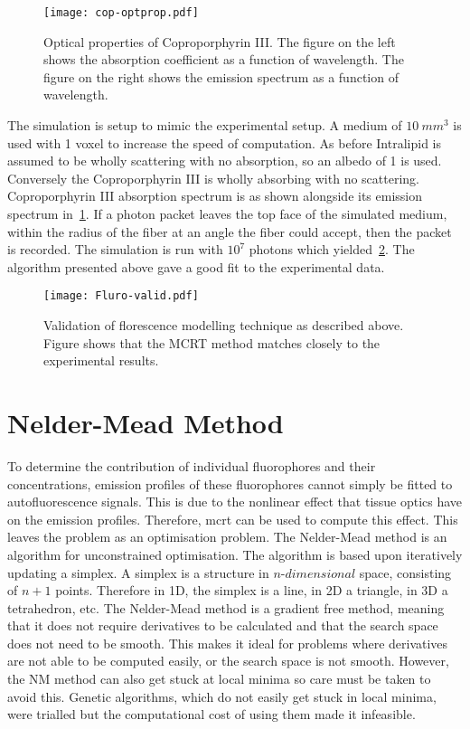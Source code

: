 \begin{figure}[!htpb]
	\centering
	\texttt{[image: cop-optprop.pdf]}
	\caption{Optical properties of Coproporphyrin III. The figure on the left shows the absorption coefficient as a function of wavelength. The figure on the right shows the emission spectrum as a function of wavelength.}
	\label{fig:coporiii}
\end{figure}

The simulation is setup to mimic the experimental setup.
A medium of $10~mm^3$ is used with 1 voxel to increase the speed of computation.
As before Intralipid is assumed to be wholly scattering with no absorption, so an albedo of 1 is used.
Conversely the Coproporphyrin III is wholly absorbing with no scattering.
Coproporphyrin III absorption spectrum is as shown alongside its emission spectrum in~\cref{fig:coporiii}.
If a photon packet leaves the top face of the simulated medium, within the radius of the fiber at an angle the fiber could accept, then the packet is recorded.
The simulation is run with $10^7$ photons which yielded~\cref{fig:flurovalid}.
The algorithm presented above gave a good fit to the experimental data.

\begin{figure}[!htpb]
  \centering
  \texttt{[image: Fluro-valid.pdf]}
  \caption{Validation of florescence modelling technique as described above. Figure shows that the MCRT method matches closely to the experimental results.}
  \label{fig:flurovalid}
\end{figure}

\FloatBarrier

\section{Nelder-Mead Method}

To determine the contribution of individual fluorophores and their concentrations, emission profiles of these fluorophores cannot simply be fitted to autofluorescence signals.
This is due to the nonlinear effect that tissue optics have on the emission profiles.
Therefore, \gls*{mcrt} can be used to compute this effect.
This leaves the problem as an optimisation problem.
The Nelder-Mead method is an algorithm for unconstrained optimisation. 
The algorithm is based upon iteratively updating a simplex. 
A simplex is a structure in $n$-$dimensional$ space, consisting of $n+1$ points. 
Therefore in 1D, the simplex is a line, in 2D a triangle, in 3D a tetrahedron, etc. 
The Nelder-Mead method is a gradient free method, meaning that it does not require derivatives to be calculated and that the search space does not need to be smooth.
This makes it ideal for problems where derivatives are not able to be computed easily, or the search space is not smooth.
However, the NM method can also get stuck at local minima so care must be taken to avoid this.
Genetic algorithms, which do not easily get stuck in local minima, were trialled but the computational cost of using them made it infeasible. 

